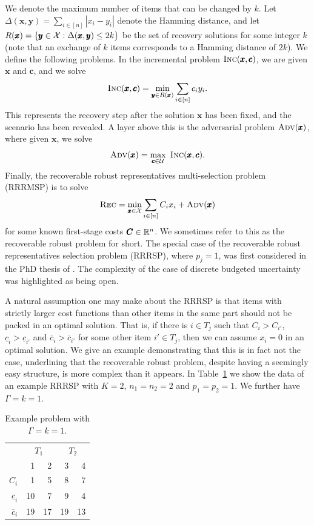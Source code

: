 We denote the maximum number of items that can be changed by $k$.
Let $\Delta(\pmb{x},\pmb{y}) = \sum_{i\in[n]} |x_i-y_i|$ denote the Hamming distance, and let $R(\pmb{x}) = \{ \pmb{y}\in\mathcal{X} : \Delta(\pmb{x},\pmb{y})\le 2k\}$ be the set of recovery solutions for some integer $k$ (note that an exchange of $k$ items corresponds to a Hamming distance of $2k$).
We define the following problems. In the incremental problem $\textsc{Inc}(\pmb{x},\pmb{c})$, we are given $\pmb{x}$ and $\pmb{c}$, and we solve
\[ \textsc{Inc}(\pmb{x},\pmb{c}) = \min_{\pmb{y}\in R(\pmb{x})} \sum_{i\in[n]} c_i y_i. \]
This represents the recovery step after the solution $\pmb{x}$ has been fixed, and the scenario has been revealed. A layer above this is the adversarial problem {$\textsc{Adv}(\pmb{x})$}, where given $\pmb{x}$, we solve
\[ \textsc{Adv}(\pmb{x}) = \max_{\pmb{c}\in\mathcal{U}}\ \textsc{Inc}(\pmb{x},\pmb{c}). \]
Finally, the recoverable robust representatives multi-selection problem (RRRMSP) is to solve
\[ \textsc{Rec} = \min_{\pmb{x}\in\mathcal{X}} \sum_{i\in[n]} C_ix_i + \textsc{Adv}(\pmb{x}) \]
for some known first-stage costs $\pmb{C}\in\mathbb{R}^n$.
We sometimes refer to this as the recoverable robust problem for short. The special case of the recoverable robust representatives selection problem (RRRSP), where $p_j=1$,  was first considered in the PhD thesis of \cite{busing2011phd}. The complexity of the case of discrete budgeted uncertainty was highlighted as being open.


A natural assumption one may make about the RRRSP is that items with strictly larger cost functions than other items in the same part should not be packed in an optimal solution. That is, if there is $i\in T_j$ such that $C_i > C_{i'}$, $\underline{c}_i > \underline{c}_{i'}$ and $\overline{c}_i > \overline{c}_{i'}$ for some other item $i'\in T_j$, then we can assume $x_i=0$ in an optimal solution. We give an example demonstrating that this is in fact not the case, underlining that the recoverable robust problem, despite having a seemingly easy structure, is more complex than it appears.
In Table~\ref{tab:example} we show the data of an example RRRSP with $K=2$, $n_1 = n_2 = 2$ and $p_1 = p_2 = 1$. We further have $\Gamma=k=1$. 

\begin{table}[htb]
\begin{center}
\begin{tabular}{r|rr|rr}
 & \multicolumn{2}{c|}{$T_1$} & \multicolumn{2}{c}{$T_2$} \\
 & 1 & 2 & 3 & 4 \\
 \hline
$C_i$ & 1 & 5 & 8 & 7 \\
$\underline{c}_i$ & 10 & 7 & 9 & 4 \\
$\overline{c}_i$ & 19 & 17 & 19 & 13
\end{tabular}
\end{center}
\caption{Example problem with $\Gamma=k=1$.\label{tab:example}}
\end{table}

